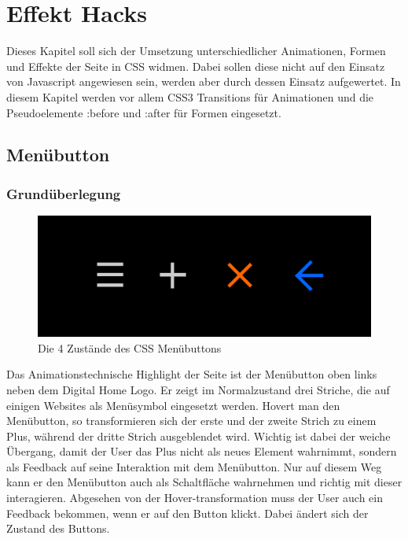 \section{Effekt Hacks}

Dieses Kapitel soll sich der Umsetzung unterschiedlicher Animationen, Formen und Effekte der Seite in CSS widmen. Dabei sollen diese nicht auf den Einsatz von Javascript angewiesen sein, werden aber durch dessen Einsatz aufgewertet.
In diesem Kapitel werden vor allem CSS3 Transitions für Animationen und die Pseudoelemente :before und :after für Formen eingesetzt.
\subsection{Menübutton}
\subsubsection{Grundüberlegung}

\begin{figure} [h]
\includegraphics[width=\textwidth]{./img/css_buttons1.png}
\caption{Die 4 Zustände des CSS Menübuttons}
\label{css_buttons1}
\end{figure}

Das Animationstechnische Highlight der Seite ist der Menübutton oben links neben dem Digital Home Logo. Er zeigt im Normalzustand drei Striche, die auf einigen Websites als Menüsymbol eingesetzt werden. Hovert man den Menübutton, so transformieren sich der erste und der zweite Strich zu einem Plus, während der dritte Strich ausgeblendet wird. Wichtig ist dabei der weiche Übergang, damit der User das Plus nicht als neues Element wahrnimmt, sondern als Feedback auf seine Interaktion mit dem Menübutton. Nur auf diesem Weg kann er den Menübutton auch als Schaltfläche wahrnehmen und richtig mit dieser interagieren. Abgesehen von der Hover-transformation muss der User auch ein Feedback bekommen, wenn er auf den Button klickt. Dabei ändert sich der Zustand des Buttons.

